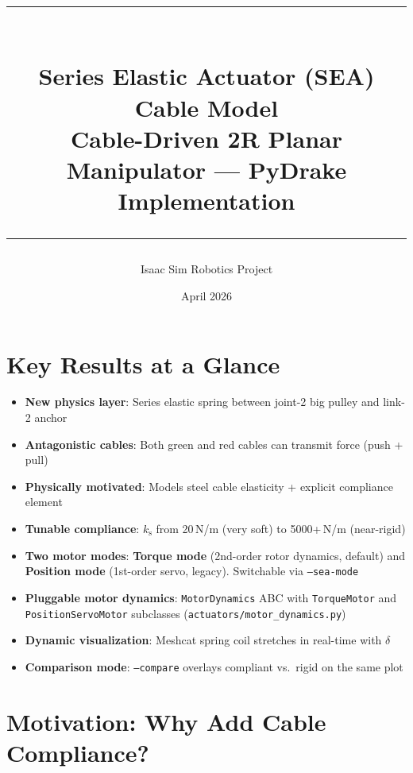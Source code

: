 \documentclass[11pt,a4paper]{article}
\title{%
    \textcolor{seaorange}{\rule{\linewidth}{1.5pt}}\\[0.4cm]
    {\Huge\bfseries Series Elastic Actuator (SEA)}\\[0.15cm]
    {\Huge\bfseries Cable Model}\\[0.3cm]
    {\Large\textcolor{drakecyan}{Cable-Driven 2R Planar Manipulator --- PyDrake Implementation}}\\[0.2cm]
    \textcolor{seaorange}{\rule{\linewidth}{1.5pt}}
}
\author{Isaac Sim Robotics Project}
\date{April 2026}
\newcommand{\ks}{k_{\mathrm{s}}}
\begin{document}
\maketitle
\thispagestyle{empty}

\section*{Key Results at a Glance}

\begin{resultbox}
\begin{itemize}[leftmargin=1.5em]
    \item \textbf{New physics layer}: Series elastic spring between joint-2 big pulley and link-2 anchor
    \item \textbf{Antagonistic cables}: Both green and red cables can transmit force (push + pull)
    \item \textbf{Physically motivated}: Models steel cable elasticity + explicit compliance element
    \item \textbf{Tunable compliance}: $\ks$ from 20\,N/m (very soft) to 5000+\,N/m (near-rigid)
    \item \textbf{Two motor modes}: \textbf{Torque mode} (2nd-order rotor dynamics, default) and \textbf{Position mode} (1st-order servo, legacy).  Switchable via \texttt{--sea-mode}
    \item \textbf{Pluggable motor dynamics}: \texttt{MotorDynamics} ABC with \texttt{TorqueMotor} and \texttt{PositionServoMotor} subclasses (\texttt{actuators/motor\_dynamics.py})
    \item \textbf{Dynamic visualization}: Meshcat spring coil stretches in real-time with $\delta$
    \item \textbf{Comparison mode}: \texttt{--compare} overlays compliant vs.\ rigid on the same plot
\end{itemize}
\end{resultbox}

\tableofcontents
\newpage

\section{Motivation: Why Add Cable Compliance?}
\label{sec:motivation}
\end{document}
